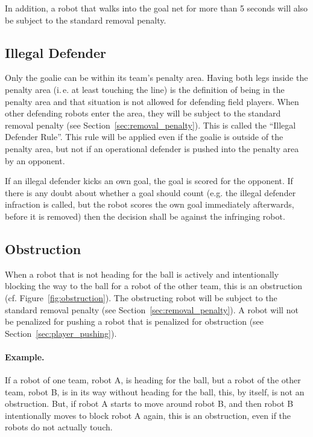 \documentclass[12pt]{article}
\newcommand{\ie}{\mbox{i.\,e.}\xspace}
\newcommand{\cf}{\mbox{cf.}\xspace}
\begin{document}
In addition, a robot that walks into the goal net for more than 5 seconds will also be subject to the standard removal penalty.

\subsection{Illegal Defender}

Only the goalie can be within its team's penalty area. Having both legs inside the penalty area (\ie at least touching the line) is the definition of being in the penalty area and that situation is not allowed for defending field players. When other defending robots enter the area, they will be subject to the standard removal penalty (see Section~\ref{sec:removal_penalty}). This is called the ``Illegal Defender Rule''. This rule will be applied even if the goalie is outside of the penalty area, but not if an operational defender is pushed into the penalty area by an opponent.

If an illegal defender kicks an own goal, the goal is scored for the opponent. If there is any doubt about whether a goal should count (e.g. the illegal defender infraction is called, but the robot scores the own goal immediately afterwards, before it is removed) then the decision shall be against the infringing robot.

\subsection{Obstruction}

When a robot that is not heading for the ball is actively and intentionally blocking the way to the ball for a robot of the other team, this is an obstruction (\cf Figure~\ref{fig:obstruction}). The obstructing robot will be subject to the standard removal penalty (see Section~\ref{sec:removal_penalty}). A robot will not be penalized for pushing a robot that is penalized for obstruction (see Section~\ref{sec:player_pushing}).

\paragraph{Example.} If a robot of one team, robot A, is heading for the ball, but a robot of the other team, robot B, is in its way without heading for the ball, this, by itself, is not an obstruction. But, if robot A starts to move around robot B, and then robot B intentionally moves to block robot A again, this is an obstruction, even if the robots do not actually touch.
\end{document}
